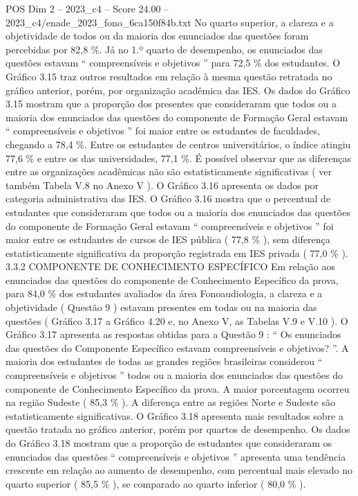 \begin{textsample}{POS Dim 2 – 2023\_c4 – Score 24.00 – 2023\_c4/enade\_2023\_fono\_6ca150f84b.txt}
No quarto superior, a clareza e a objetividade de todos ou da maioria dos enunciados das questões foram percebidas por 82,8 \%.
Já no 1.º quarto de desempenho, os enunciados das questões estavam “ compreensíveis e objetivos ” para 72,5 \% dos estudantes.
O Gráfico 3.15 traz outros resultados em relação à mesma questão retratada no gráfico anterior, porém, por organização acadêmica das IES.
Os dados do Gráfico 3.15 mostram que a proporção dos presentes que consideraram que todos ou a maioria dos enunciados das questões do componente de Formação Geral estavam “ compreensíveis e objetivos ” foi maior entre os estudantes de faculdades, chegando a 78,4 \%.
Entre os estudantes de centros universitários, o índice atingiu 77,6 \% e entre os das universidades, 77,1 \%.
É possível observar que as diferenças entre as organizações acadêmicas não são estatisticamente significativas ( ver também Tabela V.8 no Anexo V ).
O Gráfico 3.16 apresenta os dados por categoria administrativa das IES.
O Gráfico 3.16 mostra que o percentual de estudantes que consideraram que todos ou a maioria dos enunciados das questões do componente de Formação Geral estavam “ compreensíveis e objetivos ” foi maior entre os estudantes de cursos de IES pública ( 77,8 \% ), sem diferença estatisticamente significativa da proporção registrada em IES privada ( 77,0 \% ). 3.3.2 COMPONENTE DE CONHECIMENTO ESPECÍFICO Em relação aos enunciados das questões do componente de Conhecimento Específico da prova, para 84,0 \% dos estudantes avaliados da área Fonoaudiologia, a clareza e a objetividade ( Questão 9 ) estavam presentes em todas ou na maioria das questões ( Gráfico 3.17 a Gráfico 4.20 e, no Anexo V, as Tabelas V.9 e V.10 ).
O Gráfico 3.17 apresenta as respostas obtidas para a Questão 9 : “ Os enunciados das questões do Componente Específico estavam compreensíveis e objetivos? ”.
A maioria dos estudantes de todas as grandes regiões brasileiras considerou “ compreensíveis e objetivos ” todos ou a maioria dos enunciados das questões do componente de Conhecimento Específico da prova.
A maior porcentagem ocorreu na região Sudeste ( 85,3 \% ).
A diferença entre as regiões Norte e Sudeste são estatisticamente significativas.
O Gráfico 3.18 apresenta mais resultados sobre a questão tratada no gráfico anterior, porém por quartos de desempenho.
Os dados do Gráfico 3.18 mostram que a proporção de estudantes que consideraram os enunciados das questões “ compreensíveis e objetivos ” apresenta uma tendência crescente em relação ao aumento de desempenho, com percentual mais elevado no quarto superior ( 85,5 \% ), se comparado ao quarto inferior ( 80,0 \% ).

\end{textsample}

